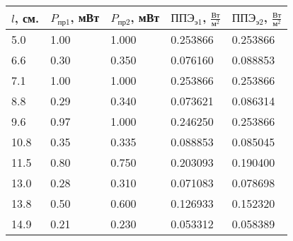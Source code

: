 \begin{longtable}{|p{3cm}|p{3cm}|p{3cm}|p{3cm}|p{3cm}|}
    \hline
    $l$, см. & $P_{\text{пр1}}$, мВт & $P_{\text{пр2}}$, мВт & $\text{ППЭ}_{\text{э1}}$, $\frac{\text{Вт}}{\text{м}^2}$ & $\text{ППЭ}_{\text{э2}}$, $\frac{\text{Вт}}{\text{м}^2}$ \\\hline
    5.0      & 1.00                  & 1.000                 & 0.253866                                                 & 0.253866                                                 \\\hline
    6.6      & 0.30                  & 0.350                 & 0.076160                                                 & 0.088853                                                 \\\hline
    7.1      & 1.00                  & 1.000                 & 0.253866                                                 & 0.253866                                                 \\\hline
    8.8      & 0.29                  & 0.340                 & 0.073621                                                 & 0.086314                                                 \\\hline
    9.6      & 0.97                  & 1.000                 & 0.246250                                                 & 0.253866                                                 \\\hline
    10.8     & 0.35                  & 0.335                 & 0.088853                                                 & 0.085045                                                 \\\hline
    11.5     & 0.80                  & 0.750                 & 0.203093                                                 & 0.190400                                                 \\\hline
    13.0     & 0.28                  & 0.310                 & 0.071083                                                 & 0.078698                                                 \\\hline
    13.8     & 0.50                  & 0.600                 & 0.126933                                                 & 0.152320                                                 \\\hline
    14.9     & 0.21                  & 0.230                 & 0.053312                                                 & 0.058389                                                 \\\hline

\end{longtable}
